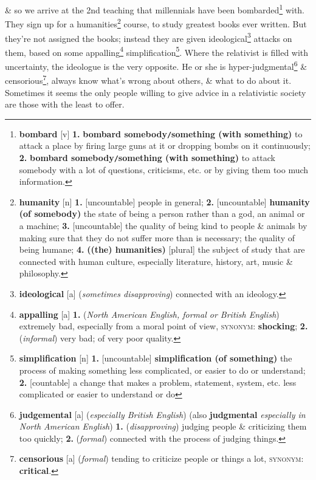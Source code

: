 \documentclass[oneside]{book}
\numberwithin{equation}{section}
\begin{document}
\& so we arrive at the 2nd teaching that millennials have been bombarded\footnote{\textbf{bombard} [v] \textbf{1.} \textbf{bombard somebody\texttt{/}something (with something)} to attack a place by firing large guns at it or dropping bombs on it continuously; \textbf{2.} \textbf{bombard somebody\texttt{/}something (with something)} to attack somebody with a lot of questions, criticisms, etc. or by giving them too much information.} with. They sign up for a humanities\footnote{\textbf{humanity} [n] \textbf{1.} [uncountable] people in general; \textbf{2.} [uncountable] \textbf{humanity (of somebody)} the state of being a person rather than a god, an animal or a machine; \textbf{3.} [uncountable] the quality of being kind to people \& animals by making sure that they do not suffer more than is necessary; the quality of being humane; \textbf{4.} \textbf{((the) humanities)} [plural] the subject of study that are connected with human culture, especially literature, history, art, music \& philosophy.} course, to study greatest books ever written. But they're not assigned the books; instead they are given ideological\footnote{\textbf{ideological} [a] (\textit{sometimes disapproving}) connected with an ideology.} attacks on them, based on some appalling\footnote{\textbf{appalling} [a] \textbf{1.} (\textit{North American English, formal or British English}) extremely bad, especially from a moral point of view, \textsc{synonym}: \textbf{shocking}; \textbf{2.} (\textit{informal}) very bad; of very poor quality.} simplification\footnote{\textbf{simplification} [n] \textbf{1.} [uncountable] \textbf{simplification (of something)} the process of making something less complicated, or easier to do or understand; \textbf{2.} [countable] a change that makes a problem, statement, system, etc. less complicated or easier to understand or do}. Where the relativist is filled with uncertainty, the ideologue is the very opposite. He or she is hyper-judgmental\footnote{\textbf{judgemental} [a] (\textit{especially British English}) (also \textbf{judgmental} \textit{especially in North American English}) \textbf{1.} (\textit{disapproving}) judging people \& criticizing them too quickly; \textbf{2.} (\textit{formal}) connected with the process of judging things.} \& censorious\footnote{\textbf{censorious} [a] (\textit{formal}) tending to criticize people or things a lot, \textsc{synonym}: \textbf{critical}.}, always know what's wrong about others, \& what to do about it. Sometimes it seems the only people willing to give advice in a relativistic society are those with the least to offer.
\end{document}
